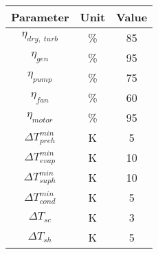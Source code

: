 \begin{tabular}{|c | c |c |}
    \hline
    \rowcolor{bluepoli!40} %
    \textbf{Parameter} & \textbf{Unit} & \textbf{Value} \T\B \\
    \hline \hline
    \(\eta_{dry,\;turb}\)  & \unit{\percent} & \num{85} \T\B \\
    \(\eta_{gen}\)  & \unit{\percent} & \num{95} \T\B \\
    \(\eta_{pump}\)  & \unit{\percent} & \num{75} \T\B \\
    \(\eta_{fan}\)  & \unit{\percent} & \num{60} \T\B \\
    \(\eta_{motor}\)  & \unit{\percent} & \num{95} \T\B \\
    \(\Delta T_{preh}^{min}\)  & \unit{\K} & \num{5} \T\B \\
    \(\Delta T_{evap}^{min}\)  & \unit{\K} & \num{10} \T\B \\
    \(\Delta T_{suph}^{min}\)  & \unit{\K} & \num{10} \T\B \\
    \(\Delta T_{cond}^{min}\)  & \unit{\K} & \num{5} \T\B \\
    \(\Delta T_{sc}\)  & \unit{\K} & \num{3} \T\B \\
    \(\Delta T_{sh}\)  & \unit{\K} & \num{5} \T\B \\
    \hline
\end{tabular}
